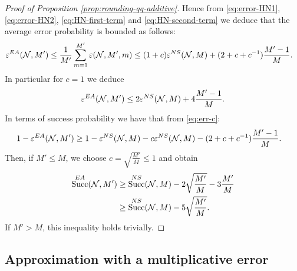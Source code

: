 \documentclass[a4paper,onecolumn,11pt,accepted=2025-10-01]{quantumarticle}
\DeclareMathOperator{\suc}{Succ}
\newcommand*{\cN}{\mathcal{N}}
\newcommand*{\eps}{\varepsilon}
\begin{document}
\begin{proof}[Proof of Proposition \ref{prop:rounding-qq-additive}]
Hence from \eqref{eq:error-HN1}, \eqref{eq:error-HN2}, \eqref{eq:HN-first-term} and \eqref{eq:HN-second-term} we deduce that the average error probability is bounded as follows:
\begin{align}\label{eq:err-c}
   & \eps_{}^{\rm{EA}}(\cN, M')\le \frac{1}{M'}\sum_{m=1}^{M'}\eps(\cN, M', m)
    \le (1+c)\eps_{}^{\rm{NS}}(\cN,M) +(2+c+c^{-1}) \frac{M'-1}{M}.
\end{align}
In particular for $c=1$ we deduce 
\begin{align}
    \eps_{}^{\rm{EA}}(\cN, M')\le 2\eps_{}^{\rm{NS}}(\cN,M) +4\frac{M'-1}{M}.
\end{align}
In terms of success probability we have that from \eqref{eq:err-c}:
\begin{align}
   1- \eps_{}^{\rm{EA}}(\cN, M')&\ge  1- \eps_{}^{\rm{NS}}(\cN,M) -c   \eps_{}^{\rm{NS}}(\cN,M)   
   -(2+c+c^{-1}) \frac{M'-1}{M}.
\end{align}
Then, if $M'\le M$, we choose $c= \sqrt{\frac{M'}{M}}\le 1$ and obtain 
\begin{align}
   \suc^{\rm{EA}}(\cN, M')&\ge \suc^{\rm{NS}}(\cN,M) -2\sqrt{\frac{M'}{M}} -3 \frac{M'}{M}
   \\&\ge  \suc^{\rm{NS}}(\cN,M)  -5 \sqrt{\frac{M'}{M}}. 
\end{align}
If $M'>M$, this inequality holds trivially.
\end{proof}


\subsection{Approximation  with a multiplicative error}\label{sec:qq-multiplicative}
\end{document}
